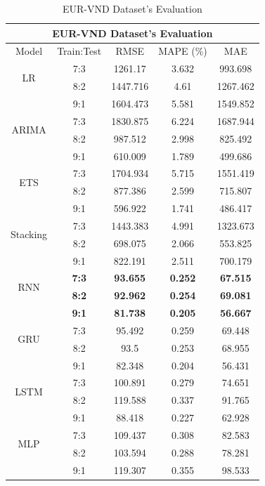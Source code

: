 \documentclass{ieeeojies}
\begin{document}
\begin{table}[H]
    \centering
    \begin{tabular}{|c|c|c|c|c|}
         \hline
         \multicolumn{5}{|c|}{\textbf{EUR-VND Dataset's Evaluation}}\\
         \hline
         \centering Model & Train:Test & RMSE & MAPE (\%) & MAE\\
         \hline
         \multirow{2}{*}{LR} & 7:3 &1261.17 &3.632 &993.698 \\ & 8:2 & 1447.716 & 4.61 & 1267.462 \\& 9:1 & 1604.473 & 5.581 & 1549.852 \\
         \hline
         \multirow{2}{*}{ARIMA} & 7:3 & 1830.875 & 6.224 & 1687.944 \\ & 8:2 & 987.512 & 2.998 & 825.492 \\ & 9:1 & 610.009&1.789 & 499.686\\
         \hline
         \multirow{2}{*}{ETS} & 7:3 & 1704.934 & 5.715 & 1551.419 \\ & 8:2 & 877.386 & 2.599 & 715.807 \\& 9:1 & 596.922 & 1.741 & 486.417 \\
         \hline
         \multirow{2}{*}{Stacking} & 7:3 & 1443.383 & 4.991 & 1323.673 \\ & 8:2 &698.075&2.066&553.825\\& 9:1 & 822.191 & 2.511 & 700.179 \\
         \hline
         \multirow{2}{*}{RNN} & \textbf{7:3} & \textbf{93.655} & \textbf{0.252} & \textbf{67.515} \\ & \textbf{8:2} & \textbf{92.962} & \textbf{0.254} & \textbf{69.081} \\ & \textbf{9:1} & \textbf{81.738} & \textbf{0.205} &\textbf{56.667} \\
         \hline
         \multirow{2}{*}{GRU} & 7:3 & 95.492 & 0.259 & 69.448 \\ & 8:2 & 93.5& 0.253 & 68.955\\ & 9:1 & 82.348& 0.204 & 56.431 \\
         \hline
         \multirow{2}{*}{LSTM} & 7:3 & 100.891 &0.279& 74.651\\ & 8:2 &119.588 &0.337 &91.765
\\&9:1&88.418& 0.227& 62.928 \\
         \hline
         \multirow{2}{*}{MLP} & 7:3 &109.437& 0.308& 82.583 \\ & 8:2 & 103.594 &0.288 &78.281 \\ & 9:1 & 119.307& 0.355& 98.533\\
         \hline
    \end{tabular}
    \caption{EUR-VND Dataset's Evaluation}
    \label{vcbresult}
\end{table}
\end{document}

